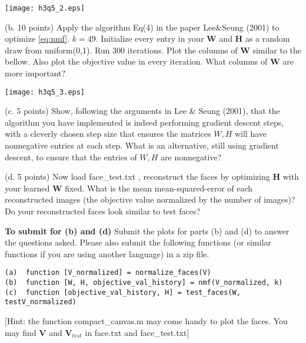 \texttt{[image: h3q5\_2.eps]}

(b. 10 points) Apply the algorithm Eq(4) in the paper Lee\&Seung (2001) to optimize \eqref{eq:nmf}. $k=49$. Initialize every entry in your $\mathbf{W}$ and $\mathbf{H}$ as a random draw from uniform(0,1). Run 300 iterations. Plot the columns of $\mathbf{W}$ similar to the bellow. Also plot the objective value in every iteration. What columns of $\mathbf{W}$ are more important? 

\texttt{[image: h3q5\_3.eps]}

(c. 5 points) Show, following the arguments in Lee \& Seung (2001), that the algorithm you have implemented is indeed performing gradient
descent steps, with a cleverly chosen step size that ensures the matrices $W,H$ will have nonnegative entries at each step.  What is an alternative,
still using gradient descent, to ensure that the entries of $W,H$ are nonnegative?  

(d. 5 points) Now load face\_test.txt , reconstruct the faces by optimizing $\mathbf{H}$ with your learned $\mathbf{W}$ fixed. What is the mean mean-squared-error of each reconstructed images (the objective value normalized by the number of images)? Do your reconstructed faces look similar to test faces? 

\textbf{To submit for (b) and (d)} Submit the plots for parts (b) and (d) to answer the questions asked. Please also submit the following functions (or similar functions if you are using another language) in a zip file. 
\begin{verbatim}
(a)  function [V_normalized] = normalize_faces(V)
(b)  function [W, H, objective_val_history] = nmf(V_normalized, k)
(c)  function [objective_val_history, H] = test_faces(W, testV_normalized)
\end{verbatim}

[Hint: the function compact\_canvas.m may come handy to plot the faces. You may find $\mathbf{V}$ and $\mathbf{V}_{test}$ in face.txt and face\_test.txt]

